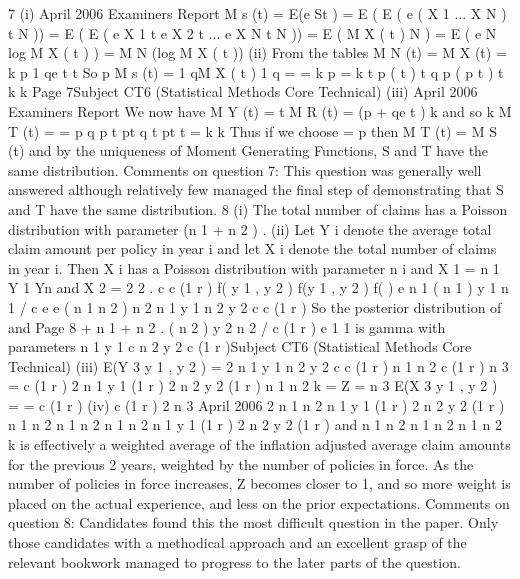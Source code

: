7
(i)
April 2006
Examiners Report
M s (t) = E(e St )
= E ( E ( e ( X 1
... X N ) t
N ))
= E ( E ( e X 1 t e X 2 t ... e X N t N ))
= E ( M X ( t ) N )
= E ( e N log M X ( t ) )
= M N (log M X ( t ))
(ii)
From the tables
M N (t) =
M X (t) =
k
p
1 qe t
t
So
p
M s (t) =
1 qM X ( t )
1 q
=
=
k
p
=
k
t
p ( t )
t q
p (
p t )
t
k
k
Page 7Subject CT6 (Statistical Methods Core Technical)
(iii)
April 2006
Examiners Report
We now have
M Y (t) =
t
M R (t) = (p + qe t ) k
and so
k
M T (t) =
=
p q
p
t
pt q
t
pt
t
=
k
k
Thus if we choose = p then M T (t) = M S (t) and by the uniqueness of
Moment Generating Functions, S and T have the same distribution.
Comments on question 7: This question was generally well answered although relatively few
managed the final step of demonstrating that S and T have the same distribution.
8
(i) The total number of claims has a Poisson distribution with parameter
(n 1 + n 2 ) .
(ii) Let Y i denote the average total claim amount per policy in year i and let X i
denote the total number of claims in year i. Then X i has a Poisson distribution
with parameter n i and
X 1 =
n 1 Y 1
Yn
and X 2 = 2 2 .
c
c (1 r )
f( y 1 , y 2 )
f(y 1 , y 2 ) f( )
e n 1 ( n 1 ) y 1 n 1 / c e
e ( n 1 n 2 )
n 2
n 1 y 1 n 2 y 2
c c (1 r )
So the posterior distribution of
and
Page 8
+ n 1 + n 2 .
( n 2 ) y 2 n 2 / c (1
r )
e
1
1
is gamma with parameters
n 1 y 1
c
n 2 y 2
c (1 r )Subject CT6 (Statistical Methods Core Technical)
(iii)
E(Y 3 y 1 , y 2 ) =
2
n 1 y 1
n 2 y 2
c
c (1 r )
n 1 n 2
c (1 r )
n 3
= c (1 r ) 2 n 1 y 1 (1 r ) 2 n 2 y 2 (1 r )
n 1 n 2
k =
Z =
n 3
E(X 3 y 1 , y 2 )
=
= c (1 r )
(iv)
c (1 r ) 2
n 3
April 2006
2
n 1 n 2
n 1 y 1 (1 r ) 2 n 2 y 2 (1 r )
n 1 n 2
n 1 n 2
n 1 n 2
n 1 y 1 (1 r ) 2 n 2 y 2 (1 r )
and
n 1 n 2
n 1 n 2
n 1 n 2
k is effectively a weighted average of the inflation adjusted average claim
amounts for the previous 2 years, weighted by the number of policies in force.
As the number of policies in force increases, Z becomes closer to 1, and so
more weight is placed on the actual experience, and less on the prior
expectations.
Comments on question 8: Candidates found this the most difficult question in the paper.
Only those candidates with a methodical approach and an excellent grasp of the relevant
bookwork managed to progress to the later parts of the question.
